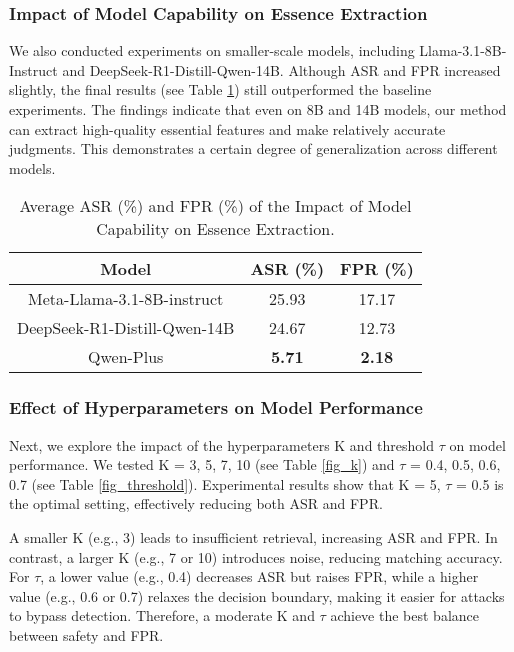 \subsubsection{Impact of Model Capability on Essence  Extraction}
We also conducted experiments on smaller-scale models, including Llama-3.1-8B-Instruct and DeepSeek-R1-Distill-Qwen-14B. Although ASR and FPR increased slightly, the final results (see Table \ref{fig_models}) still outperformed the baseline experiments. The findings indicate that even on 8B and 14B models, our method can extract high-quality essential features and make relatively accurate judgments. This demonstrates a certain degree of generalization across different models.
\begin{table}[h]
    \centering
    \small
    \begin{tabularx}{\linewidth}{@{}ccc@{}}
    \toprule
    \multicolumn{1}{c}{\textbf{Model}} & \textbf{ASR (\%)} & \textbf{FPR (\%)} \\ \midrule
        Meta-Llama-3.1-8B-instruct  & 25.93  & 17.17  \\
        DeepSeek-R1-Distill-Qwen-14B  & 24.67  & 12.73  \\
        Qwen-Plus  & {\textbf{5.71}}  & {\textbf{2.18}}  \\
    \bottomrule
    \end{tabularx}
    \caption{Average ASR (\%) and FPR (\%) of the Impact of Model Capability on Essence Extraction.}
    \label{fig_models}
\end{table}


\subsubsection{Effect of Hyperparameters on Model Performance}
Next, we explore the impact of the hyperparameters K and threshold $\tau$ on model performance. We tested K = {3, 5, 7, 10} (see Table \ref{fig_k}) and $\tau$ = {0.4, 0.5, 0.6, 0.7} (see Table \ref{fig_threshold}). Experimental results show that K = 5, $\tau$ = 0.5 is the optimal setting, effectively reducing both ASR and FPR.

A smaller K (e.g., 3) leads to insufficient retrieval, increasing ASR and FPR. In contrast, a larger K (e.g., 7 or 10) introduces noise, reducing matching accuracy. For $\tau$, a lower value (e.g., 0.4) decreases ASR but raises FPR, while a higher value (e.g., 0.6 or 0.7) relaxes the decision boundary, making it easier for attacks to bypass detection. Therefore, a moderate K and $\tau$ achieve the best balance between safety and FPR.

